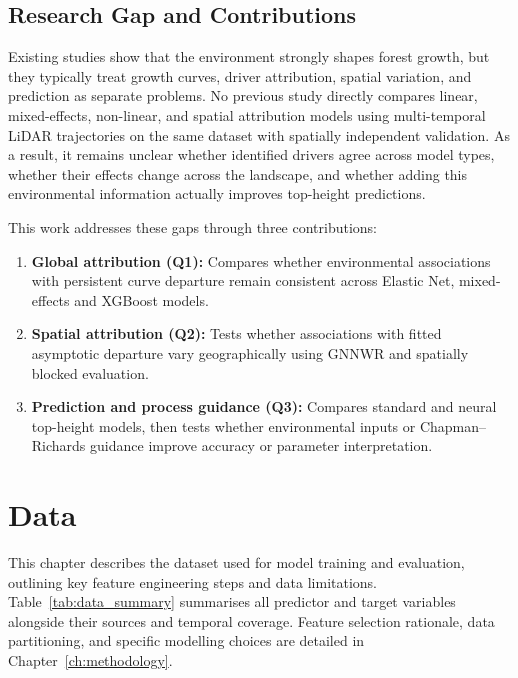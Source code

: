 \documentclass[logo,msc,ai]{infthesis}           %
\begin{document}
\section{Research Gap and Contributions}
Existing studies show that the environment strongly shapes forest growth, but they typically treat growth curves, driver attribution, spatial variation, and prediction as separate problems. No previous study directly compares linear, mixed-effects, non-linear, and spatial attribution models using multi-temporal LiDAR trajectories on the same dataset with spatially independent validation. As a result, it remains unclear whether identified drivers agree across model types, whether their effects change across the landscape, and whether adding this environmental information actually improves top-height predictions.

This work addresses these gaps through three contributions:
\begin{enumerate}
\setlength\itemsep{0pt}
\item \textbf{Global attribution (Q1):}
Compares whether environmental associations with persistent curve departure remain consistent across Elastic Net, mixed-effects and XGBoost models.
\item \textbf{Spatial attribution (Q2):}
Tests whether associations with fitted asymptotic departure vary geographically using GNNWR and spatially blocked evaluation.
\item \textbf{Prediction and process guidance (Q3):}
Compares standard and neural top-height models, then tests whether environmental inputs or Chapman--Richards guidance improve accuracy or parameter interpretation.
\end{enumerate}

\chapter{Data}
This chapter describes the dataset used for model training and evaluation, outlining key feature engineering steps and data limitations. Table~\ref{tab:data_summary} summarises all predictor and target variables alongside their sources and temporal coverage. Feature selection rationale, data partitioning, and specific modelling choices are detailed in Chapter~\ref{ch:methodology}.
\end{document}
